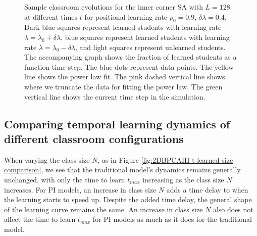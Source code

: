 \begin{figure}[htbp!]
   \caption{Sample classroom evolutions for the inner corner SA with $L=128$ at different times $t$ for positional learning rate $\rho_0=0.9$, $\delta\lambda = 0.4$.
   Dark blue squares represent learned students with learning rate $\lambda = \lambda_0 + \delta\lambda$, blue squares represent learned students with learning rate $\lambda = \lambda_0 - \delta\lambda$, and light squares represent unlearned students.
   The accompanying graph shows the fraction of learned students as a function time step.
   The blue dots represent data points. 
   The yellow line shows the power law fit.
   The pink dashed vertical line shows where we truncate the data for fitting the power law.
   The green vertical line shows the current time step in the simulation.
   }
   \label{fig:2DBPCAIH sample class evolution trad low rho high delta}
\end{figure}

\subsection{Comparing temporal learning dynamics of different classroom configurations}

When varying the class size $N$, as in Figure \ref{fig:2DBPCAIH t-learned size comparison}, we see that the traditional model's dynamics remains generally unchanged, with only the time to learn $t_{max}$ increasing as the class size $N$ increases. 
For PI models, an increase in class size $N$ adds a time delay to when the learning starts to speed up. 
Despite the added time delay, the general shape of the learning curve remains the same.
An increase in class size $N$ also does not affect the time to learn $t_{max}$ for PI models as much as it does for the traditional model.

